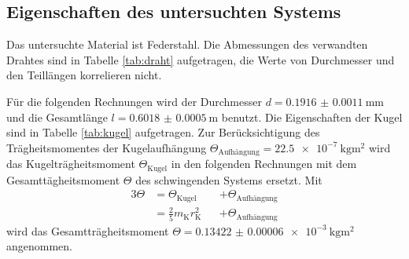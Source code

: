 \subsection{Eigenschaften des untersuchten Systems}
\label{sec:auswertung1}
Das untersuchte Material ist Federstahl.
Die Abmessungen des verwandten Drahtes sind in Tabelle \ref{tab:draht} aufgetragen, die Werte von Durchmesser und den Teillängen korrelieren nicht.
\begin{figure}
\centering
\begin{minipage}[t]{0.4\textwidth}
\centering


\end{minipage}
\hspace{5pt}
\begin{minipage}[t]{0.4\textwidth}
\centering


\end{minipage}
\end{figure}
Für die folgenden Rechnungen wird der Durchmesser $d=\SI{0.1916(11)}{\milli\meter}$ und die Gesamtlänge $l=\SI{0.6018(5)}{\meter}$ benutzt.
\newpage
Die Eigenschaften der Kugel sind in Tabelle \ref{tab:kugel} aufgetragen.
Zur Berücksichtigung des Trägheitsmomentes der Kugelaufhängung $\Theta_\text{Aufhängung}=\SI{22.5e-7}{\kilo\gram\meter\squared}$ \cite{V102} wird das Kugelträgheitsmoment $\Theta_\text{Kugel}$ in den folgenden Rechnungen mit dem Gesamttägheitsmoment $\Theta$ des schwingenden Systems ersetzt.
Mit 
\begin{alignat}{3}
	\Theta	&=\Theta_\text{Kugel} &&+\Theta_\text{Aufhängung}\label{eq:gesamttraegheit}\\ 
		&=\frac{2}{5} m_\text{K} r_\text{K}^2 &&+\Theta_\text{Aufhängung} %
\end{alignat}
wird das Gesamtträgheitsmoment $\Theta=\SI{0.13422(6)e-3}{\kilo\gram\meter\squared}$ angenommen.

